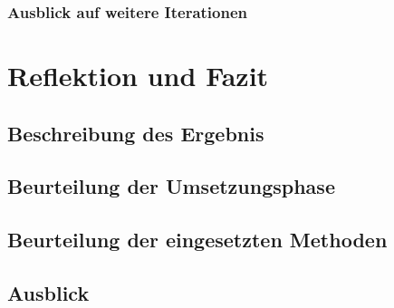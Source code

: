 \documentclass[12pt]{article}
\begin{document}
\subsubsection{Ausblick auf weitere Iterationen}

\section{Reflektion und Fazit}
\subsection{Beschreibung des Ergebnis}
\subsection{Beurteilung der Umsetzungsphase}
\subsection{Beurteilung der eingesetzten Methoden}
\subsection{Ausblick}

\newpage



\end{document}

